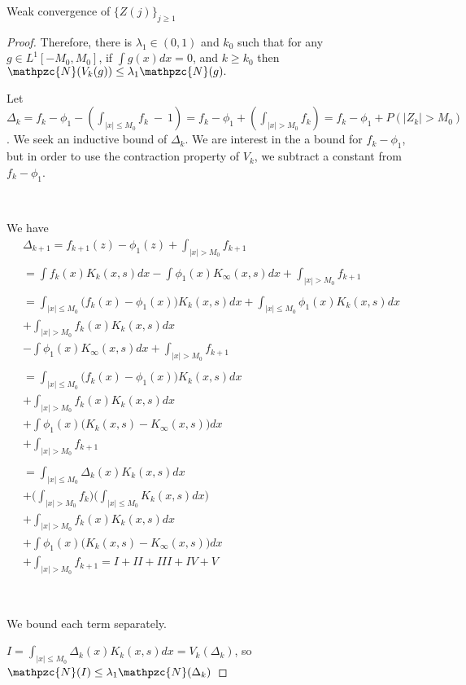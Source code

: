 \documentclass[12pt]{article}
\begin{document}
\begin{section}{Weak convergence of $\{Z(j)\}_{j \ge 1}$ }
\begin{proof}
Therefore, there is $\lambda_1 \in (0,1)$ and $k_0$ such that for any $g \in L^1[-M_0,M_0]$, if $\int g(x)dx = 0$, and $k \ge k_0$ then $\mathpzc{N}(V_k(g)) \le \lambda_1 \mathpzc{N}(g).$ 

Let $\Delta_k =  f_k - \phi_1 - (\int_{|x| \le M_0} f_k \ - \ 1)  = 
f_k - \phi_1 + (\int_{|x| > M_0} f_k) = f_k - \phi_1 + P(|Z_k| > M_0) $. We seek an inductive bound of $\Delta_{k}$. We are interest in the a bound for $f_k - \phi_1$, but in order to use the contraction property of $V_k$, we subtract a constant from $f_k - \phi_1$.  

\  

We have
\begin{align*}
&\Delta_{k+1} = f_{k+1}(z) - \phi_1(z) + \int_{|x| > M_0} f_{k+1}  &\\
&\ &\\
&= \int f_k(x) K_k(x,s) dx - \int \phi_1(x) K_{\infty}(x,s) dx + \int_{|x| > M_0} f_{k+1} &\\
&\ &\\
&= \int_{|x| \le M_0} \big(f_k(x) - \phi_1(x) \big) K_k(x,s) dx + \int_{|x| \le M_0} \phi_1(x) K_k(x,s) dx &\\
&+  \int_{|x| > M_0} f_k(x)  K_k(x,s) dx &\\
& - \int \phi_1(x) K_{\infty}(x,s) dx  + \int_{|x| > M_0} f_{k+1} &\\
&\ &\\
& = \int_{|x| \le M_0} \big(f_k(x) - \phi_1(x) \big) K_k(x,s) dx  &\\
&+  \int_{|x| > M_0} f_k(x)  K_k(x,s) dx &\\
&+ \int \phi_1(x) \big( K_k(x,s) - K_{\infty}(x,s) \big) dx &\\
&+ \int_{|x| > M_0} f_{k+1} &\\
&\ &\\
& = \int_{|x| \le M_0} \Delta_k(x) K_k(x,s) dx  &\\
&+  \big( \int_{|x| > M_0} f_{k} \big) \big( \int_{|x| \le M_0} K_k(x,s) dx \big) &\\
&+  \int_{|x| > M_0} f_k(x)  K_k(x,s) dx &\\
&+ \int \phi_1(x) \big( K_k(x,s) - K_{\infty}(x,s) \big) dx &\\
&+ \int_{|x| > M_0} f_{k+1} = I + II + III + IV + V&
\end{align*}  

\  

We bound each term separately.  


$I = \int_{|x| \le M_0} \Delta_k(x) K_k(x,s) dx = V_k( \Delta_k)$, so $\mathpzc{N}(I) \le \lambda_1 \mathpzc{N}(\Delta_k)$  


\end{proof}
\end{section}
\end{document}
